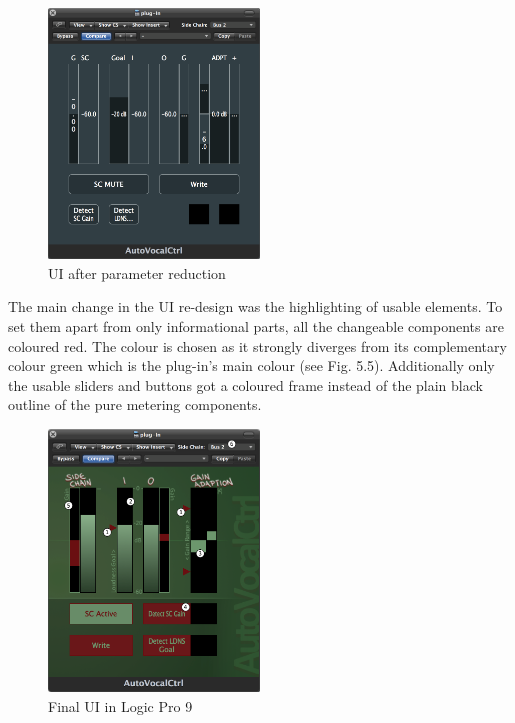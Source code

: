 \begin{figure}[H]
\includegraphics[width=0.5\textwidth]{images/designVorher}
	\centering
	\caption{UI after parameter reduction}
\end{figure}

The main change in the UI re-design was the highlighting of usable elements. To set them apart from only informational parts, all the changeable components are coloured red. The colour is chosen as it strongly diverges from its complementary colour green which is the plug-in’s main colour (see Fig. 5.5). Additionally only the usable sliders and buttons got a coloured frame instead of the plain black outline of the pure metering components.\\

\begin{figure}[H]
\includegraphics[width=0.5\textwidth]{images/designNeuNum}
	\centering
	\caption{Final UI in Logic Pro 9}
\end{figure}

